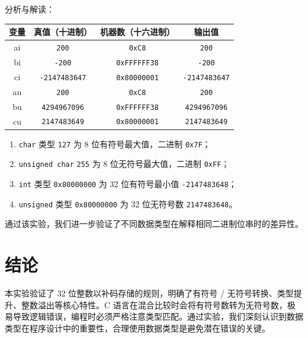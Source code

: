 \documentclass[12pt, a4paper]{academics}
\begin{document}
分析与解读：

\begin{center}
\begin{tabular}{|c|c|c|c|}
\hline
变量 & 真值（十进制） & 机器数（十六进制） & 输出值 \\
\hline
ai & \texttt{200} & \texttt{0xC8} & \texttt{200} \\
\hline
bi & \texttt{-200} & \texttt{0xFFFFFF38} & \texttt{-200} \\
\hline
ci & \texttt{-2147483647} & \texttt{0x80000001} & \texttt{-2147483647} \\
\hline
au & \texttt{200} & \texttt{0xC8} & \texttt{200} \\
\hline
bu & \texttt{4294967096} & \texttt{0xFFFFFF38} & \texttt{4294967096} \\
\hline
cu & \texttt{2147483649} & \texttt{0x80000001} & \texttt{2147483649} \\
\hline
\end{tabular}
\end{center}

\begin{enumerate}
    \item \texttt{char} 类型 \texttt{127} 为 8 位有符号最大值，二进制 \texttt{0x7F}；
    \item \texttt{unsigned char} \texttt{255} 为 8 位无符号最大值，二进制 \texttt{0xFF}；
    \item \texttt{int} 类型 \texttt{0x80000000} 为 32 位有符号最小值 \texttt{-2147483648}；
    \item \texttt{unsigned} 类型 \texttt{0x80000000} 为 32 位无符号数 \texttt{2147483648}。
\end{enumerate}

通过该实验，我们进一步验证了不同数据类型在解释相同二进制位串时的差异性。

\section{结论}

本实验验证了 32 位整数以补码存储的规则，明确了有符号 / 无符号转换、类型提升、整数溢出等核心特性。C 语言在混合比较时会将有符号数转为无符号数，极易导致逻辑错误，编程时必须严格注意类型匹配。通过实验，我们深刻认识到数据类型在程序设计中的重要性，合理使用数据类型是避免潜在错误的关键。
\end{document}
